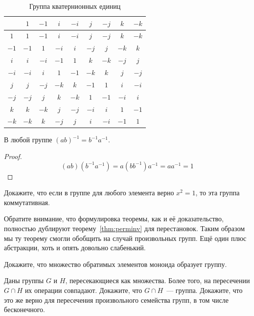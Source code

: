 \begin{table}[h]
	\centering
	\begin{tabular}{c|cccccccc}
		& $1$ & $-1$ & $i$ & $-i$ & $j$ & $-j$ & $k$ & $-k$ \\ 
		\hline $1$ & $1$ & $-1$ & $i$ & $-i$ & $j$ & $-j$ & $k$ & $-k$  \\ 
		$-1$ & $-1$ & $1$&$-i$ &$i$ & $-j$ & $j$ & $-k$ & $k$ \\ 
		$i$ & $i$ & $-i$ & $-1$ & $1$ & $k$& $-k$ & $-j$ & $j$ \\ 
		$-i$ & $-i$ & $i$ & $1$ & $-1$ & $-k$& $k$ & $j$ & $-j$ \\ 
		$j$ & $j$ & $-j$ & $-k$ &$k$ & $-1$& $1$ & $i$ & $-i$ \\ 
		$-j$ & $-j$ & $j$ & $k$ &$-k$ & $1$& $-1$ & $-i$ & $i$ \\ 
		$k$ & $k$ & $-k$ & $j$ & $-j$ &$-i$ & $i$  & $1$ &$-1$  \\ 
		$-k$ & $-k$ & $k$ & $-j$ & $j$ &$i$ & $-i$  & $-1$ &$1$  \\ 
	\end{tabular}
	\caption{Группа кватернионных единиц}\label{tb:qtgrp}
\end{table}

\begin{thm}
	В любой группе $(ab)^{-1}=b^{-1}a^{-1}$.
\end{thm}
\begin{proof}
	\[
	(ab)(b^{-1}a^{-1}) = a(bb^{-1})a^{-1} = aa^{-1} = 1
	\]
\end{proof}

\begin{exercise}
	Докажите, что если в группе для любого элемента верно $x^2 = 1$, то эта группа коммутативная.
\end{exercise}

Обратите внимание, что формулировка теоремы, как и её доказательство, полностью дублируют теорему~\ref{thm:perminv} для перестановок. Таким образом мы ту теорему смогли обобщить на случай произвольных групп. Ещё один плюс абстракции, хоть и опять довольно слабенький.

\begin{exercise}
	Докажите, что множество обратимых элементов моноида образует группу.
\end{exercise}

\begin{exercise}\label{ex:grpint}
	Даны группы $G$ и $H$, пересекающиеся как множества. Более того, на пересечении $G\cap H$ их операции совпадают. Докажите, что $G\cap H$~— группа. Докажите, что это же верно для пересечения произвольного семейства групп, в том числе бесконечного.
\end{exercise}

